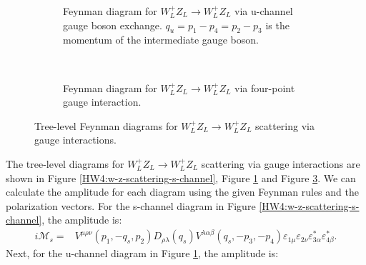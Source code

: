 \begin{figure}[!th]
\begin{subfigure}{0.49\textwidth}
    \caption{Feynman diagram for $W^+_L Z_L \to W^+_L Z_L$ via u-channel gauge boson exchange. $q_u = p_1 - p_4 = p_2 - p_3$ is the momentum of the intermediate gauge boson.}
    \label{HW4:w-z-scattering-u-channel}
    \end{subfigure}\\
    \begin{subfigure}{0.49\textwidth}
    \caption{Feynman diagram for $W^+_L Z_L \to W^+_L Z_L$ via four-point gauge interaction.}
    \label{HW4:w-z-scattering-four-point}
     \end{subfigure}
    \caption{Tree-level Feynman diagrams for $W^+_L Z_L \to W^+_L Z_L$ scattering via gauge interactions.}
\end{figure}
The tree-level diagrams for $W^+_L Z_L \to W^+_L Z_L$ scattering via gauge interactions are shown in Figure \ref{HW4:w-z-scattering-s-channel}, Figure \ref{HW4:w-z-scattering-u-channel} and Figure \ref{HW4:w-z-scattering-four-point}. We can calculate the amplitude for each diagram using the given Feynman rules and the polarization vectors. For the s-channel diagram in Figure \ref{HW4:w-z-scattering-s-channel}, the amplitude is:
\begin{align}
    i\mathcal{M}_s = & V^{\mu\rho\nu}(p_1,-q_s,p_2) D_{\rho\lambda}(q_s) V^{\lambda\alpha\beta}(q_s,-p_3,-p_4) \varepsilon_{1\mu} \varepsilon_{2\nu} \varepsilon_{3\alpha}^* \varepsilon_{4\beta}^*.
\end{align}
Next, for the u-channel diagram in Figure \ref{HW4:w-z-scattering-u-channel}, the amplitude is:
